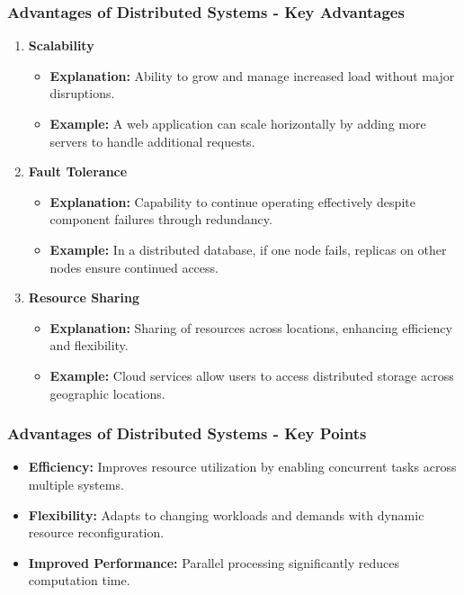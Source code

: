 \documentclass[aspectratio=169]{beamer}
\begin{document}
\begin{frame}[fragile]
    \frametitle{Advantages of Distributed Systems - Key Advantages}
    \begin{enumerate}
        \item \textbf{Scalability}
        \begin{itemize}
            \item \textbf{Explanation:} Ability to grow and manage increased load without major disruptions.
            \item \textbf{Example:} A web application can scale horizontally by adding more servers to handle additional requests.
        \end{itemize}

        \item \textbf{Fault Tolerance}
        \begin{itemize}
            \item \textbf{Explanation:} Capability to continue operating effectively despite component failures through redundancy.
            \item \textbf{Example:} In a distributed database, if one node fails, replicas on other nodes ensure continued access.
        \end{itemize}

        \item \textbf{Resource Sharing}
        \begin{itemize}
            \item \textbf{Explanation:} Sharing of resources across locations, enhancing efficiency and flexibility.
            \item \textbf{Example:} Cloud services allow users to access distributed storage across geographic locations.
        \end{itemize}
    \end{enumerate}
\end{frame}

\begin{frame}[fragile]
    \frametitle{Advantages of Distributed Systems - Key Points}
    \begin{itemize}
        \item \textbf{Efficiency:} Improves resource utilization by enabling concurrent tasks across multiple systems.
        
        \item \textbf{Flexibility:} Adapts to changing workloads and demands with dynamic resource reconfiguration.
        
        \item \textbf{Improved Performance:} Parallel processing significantly reduces computation time.
    \end{itemize}
\end{frame}
\end{document}
